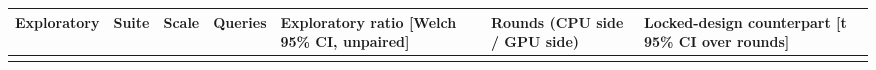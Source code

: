 \begin{longtable}{lllllll}
\toprule
Exploratory & Suite & Scale & Queries & Exploratory ratio [Welch 95\% CI, unpaired] & Rounds (CPU side / GPU side) & Locked-design counterpart [t 95\% CI over rounds] \\
\midrule
\endhead
\bottomrule
\endfoot
\end{longtable}
